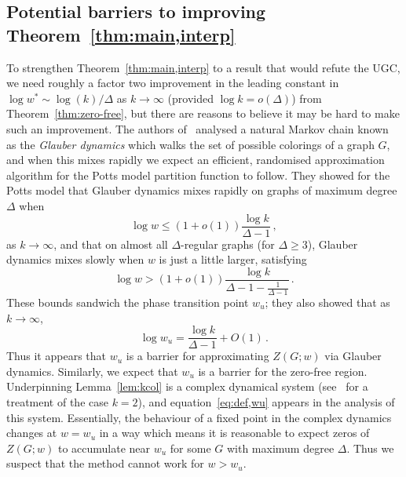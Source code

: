 \documentclass[10pt,a4paper]{article}
\theoremstyle{definition}
\begin{document}
\subsection{Potential barriers to improving Theorem~\ref{thm:main,interp}}\label{sec:barrers,interp}
%
To strengthen Theorem~\ref{thm:main,interp} to a result that would refute the UGC, we need roughly a factor two improvement in the leading constant in $\log w^* \sim \log (k)/\Delta$ as $k\to\infty$ (provided $\log k=o(\Delta)$) from Theorem~\ref{thm:zero-free}, but there are reasons to believe it may be hard to make such an improvement. 
%
The authors of~\cite{BGP16} analysed a natural Markov chain known as the \emph{Glauber dynamics} which walks the set of possible colorings of a graph $G$, and when this mixes rapidly we expect an efficient, randomised approximation algorithm for the Potts model partition function to follow.
They showed for the Potts model that Glauber dynamics mixes rapidly on graphs of maximum degree $\Delta$ when 
\[
\log w \le (1+o(1))\frac{\log k}{\Delta-1}\,,
\]
as $k\to\infty$, and that on almost all $\Delta$-regular graphs (for $\Delta\ge 3$), Glauber dynamics mixes slowly when $w$ is just a little larger, satisfying
\[
\log w > (1+o(1))\frac{\log k}{\Delta-1-\frac{1}{\Delta-1}}\,.
\]
These bounds sandwich the phase transition point $w_u$; they also showed that as $k\to\infty$, 
\[
\log w_u = \frac{\log k}{\Delta-1} + O(1)\,.
\]
Thus it appears that $w_u$ is a barrier for approximating $Z(G;w)$ via Glauber dynamics. 
%
Similarly, we expect that $w_u$ is a barrier for the zero-free region. 
Underpinning Lemma~\ref{lem:kcol} is a complex dynamical system (see~\cite{PR18} for a treatment of the case $k=2$), and equation~\eqref{eq:def,wu} appears in the analysis of this system.
Essentially, the behaviour of a fixed point in the complex dynamics changes at $w=w_u$ in a way which means it is reasonable to expect zeros of $Z(G;w)$ to accumulate near $w_u$ for some $G$ with maximum degree $\Delta$. 
Thus we suspect that the method cannot work for $w>w_u$. 
%
%
\end{document}
